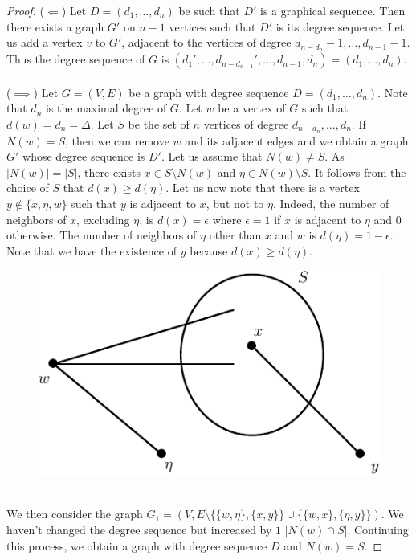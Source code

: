 \documentclass[12pt,a4paper]{article}
\theoremstyle{definition}
\begin{document}
\begin{proof}
($\Leftarrow$) Let $D=(d_1, \dots , d_n)$ be such that $D'$ is a graphical sequence. Then there exists a graph $G'$ on $n-1$ vertices such that $D'$ is its degree sequence. Let us add a vertex  $v$ to $G'$, adjacent to the vertices of degree $d_{n-d_n} -1, \dots , d_{n-1}-1$. Thus the degree sequence of $G$ is $(d_1', \dots , d_{n-d_{n-1}}', \dots , d_{n-1}, d_n)= (d_1, \dots , d_n)$. 
\\\\
($\implies$) Let $G=(V,E)$ be a graph with degree sequence $D=(d_1, \dots , d_n)$. Note that $d_n$ is the maximal degree of $G$. Let $w$ be a vertex of $G$ such that $d(w)=d_n = \Delta$. Let $S$ be the set of $n$ vertices of degree $d_{n-d_n}, \dots , d_n$. If $N(w)=S$, then we can remove $w$ and its adjacent edges and we obtain a graph $G'$ whose degree sequence is $D'$. Let us assume that $N(w) \neq S$. As $|N(w)| = |S|$, there exists $x \in S \setminus N( w)$ and $\eta \in N(w) \setminus S$. It follows from the choice of $S$ that $d(x) \geq d( \eta)$. Let us now note that there is a vertex $y \notin \{ x,  \eta, w \}$ such that $ y$ is adjacent to $x$, but not to $\eta$. Indeed, the number of neighbors of $x$, excluding $\eta$, is $d(x)= \epsilon$ where $\epsilon = 1$ if $x$ is adjacent to $\eta$ and $0$ otherwise. The number of neighbors of $\eta$ other than $x$ and $w$ is $d( \eta)=1- \epsilon$. Note that we have the existence of $y$ because $d(x) \geq d( \eta)$. 
\begin{figure}[hbtp]
\centering
\includegraphics[scale=1]{images/graphmiss.pdf}
\end{figure}
\\
We then consider the graph $G_1=(V,E \setminus \{ \{w, \eta\}, \{x, y\} \} \cup \{ \{ w,x\}, \{ \eta, y\} \})$. We haven't changed the degree sequence but increased by $1$ $|N(w) \cap S|$. Continuing this process, we obtain a graph with degree sequence $D$ and $N(w) = S$. 
\end{proof}
\end{document}
